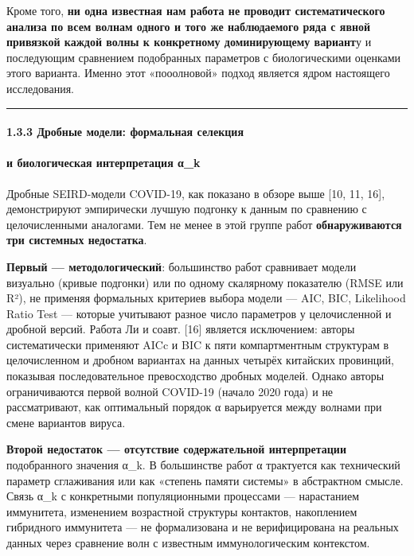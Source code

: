 \documentclass[12pt]{article}
\begin{document}
Кроме того, \textbf{ни одна известная нам работа не проводит
систематического} \textbf{анализа по всем волнам одного и того же
наблюдаемого ряда с явной} \textbf{привязкой каждой волны к конкретному
доминирующему вариант}у и последующим сравнением подобранных параметров
с биологическими оценками этого варианта. Именно этот «пооолновой»
подход является ядром настоящего исследования.

\begin{center}\rule{0.5\linewidth}{0.5pt}\end{center}

\paragraph{1.3.3 Дробные модели: формальная
селекция}\label{ux434ux440ux43eux431ux43dux44bux435-ux43cux43eux434ux435ux43bux438-ux444ux43eux440ux43cux430ux43bux44cux43dux430ux44f-ux441ux435ux43bux435ux43aux446ux438ux44f}

\paragraph{и биологическая интерпретация
α\_k}\label{ux438-ux431ux438ux43eux43bux43eux433ux438ux447ux435ux441ux43aux430ux44f-ux438ux43dux442ux435ux440ux43fux440ux435ux442ux430ux446ux438ux44f-ux3b1_k}

Дробные SEIRD-модели COVID-19, как показано в обзоре выше {[}10, 11,
16{]}, демонстрируют эмпирически лучшую подгонку к данным по сравнению с
целочисленными аналогами. Тем не менее в этой группе работ
\textbf{обнаруживаются три системных недостатка}.

\textbf{Первый --- методологический}: большинство работ сравнивает
модели визуально (кривые подгонки) или по одному скалярному показателю
(RMSE или R²), не применяя формальных критериев выбора модели --- AIC,
BIC, Likelihood Ratio Test --- которые учитывают разное число параметров
у целочисленной и дробной версий. Работа Ли и соавт. {[}16{]} является
исключением: авторы систематически применяют AICc и BIC к пяти
компартментным структурам в целочисленном и дробном вариантах на данных
четырёх китайских провинций, показывая последовательное превосходство
дробных моделей. Однако авторы ограничиваются первой волной COVID-19
(начало 2020 года) и не рассматривают, как оптимальный порядок α
варьируется между волнами при смене вариантов вируса.

\textbf{Второй недостаток --- отсутствие содержательной интерпретации}
подобранного значения α\_k. В большинстве работ α трактуется как
технический параметр сглаживания или как «степень памяти системы» в
абстрактном смысле. Связь α\_k с конкретными популяционными процессами
--- нарастанием иммунитета, изменением возрастной структуры контактов,
накоплением гибридного иммунитета --- не формализована и не
верифицирована на реальных данных через сравнение волн с известным
иммунологическим контекстом.
\end{document}
